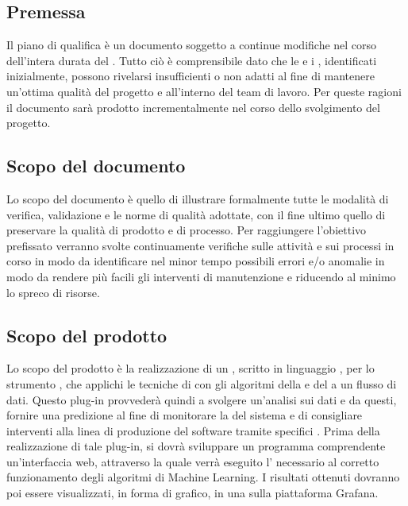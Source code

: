 \documentclass[../piano-di-qualifica.tex]{subfiles}
\begin{document}
\subsection{Premessa}%
\label{sub:premessa}
Il piano di qualifica è un documento soggetto a continue modifiche nel corso dell'intera durata del .
Tutto ciò è comprensibile dato che le  e i , identificati inizialmente, possono rivelarsi insufficienti o non adatti al fine di mantenere un'ottima qualità del progetto e all'interno del team di lavoro.
Per queste ragioni il documento sarà prodotto incrementalmente nel corso dello svolgimento del progetto.

\subsection{Scopo del documento}%
\label{sub:scopo_del_documento}
Lo scopo del documento è quello di illustrare formalmente tutte le modalità di verifica, validazione e le norme di qualità adottate, con il fine ultimo quello di preservare la qualità di prodotto e di processo.
Per raggiungere l'obiettivo prefissato verranno svolte continuamente verifiche sulle attività e sui processi in corso in modo da identificare nel minor tempo possibili errori e/o anomalie in modo da rendere più facili gli interventi di manutenzione e riducendo al minimo lo spreco di risorse.

\subsection{Scopo del prodotto}%
\label{sub:scopo_del_prodotto}
Lo scopo del prodotto è la realizzazione di un , scritto in linguaggio , per lo strumento  ,
che applichi le tecniche di  con gli algoritmi della  e del  a un flusso di dati.
Questo plug-in provvederà quindi a svolgere un'analisi sui dati e da questi, fornire una predizione al fine di monitorare la  del sistema e di consigliare 
interventi alla linea di produzione del software tramite specifici .
Prima della realizzazione di tale plug-in, si dovrà sviluppare un programma comprendente un'interfaccia web, attraverso la quale verrà eseguito l' necessario al corretto
funzionamento degli algoritmi di Machine Learning.
I risultati ottenuti dovranno poi essere visualizzati, in forma di grafico, in una  sulla piattaforma Grafana.
\end{document}

